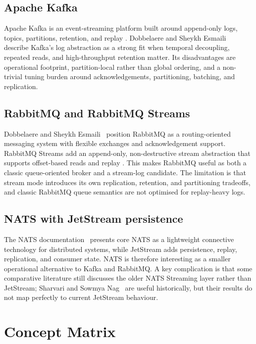\subsection{Apache Kafka}

Apache Kafka is an event-streaming platform built around append-only logs, topics, partitions, retention, and replay \cite{kafka2026official}. Dobbelaere and Sheykh Esmaili~\cite{dobbelaere2017kafkarabbitmq} describe Kafka's log abstraction as a strong fit when temporal decoupling, repeated reads, and high-throughput retention matter. Its disadvantages are operational footprint, partition-local rather than global ordering, and a non-trivial tuning burden around acknowledgements, partitioning, batching, and replication.

\subsection{RabbitMQ and RabbitMQ Streams}

Dobbelaere and Sheykh Esmaili~\cite{dobbelaere2017kafkarabbitmq} position RabbitMQ as a routing-oriented messaging system with flexible exchanges and acknowledgement support. RabbitMQ Streams add an append-only, non-destructive stream abstraction that supports offset-based reads and replay \cite{rabbitmq2026streams}. This makes RabbitMQ useful as both a classic queue-oriented broker and a stream-log candidate. The limitation is that stream mode introduces its own replication, retention, and partitioning tradeoffs, and classic RabbitMQ queue semantics are not optimised for replay-heavy logs.

\subsection{NATS with JetStream persistence}

The NATS documentation~\cite{nats2026overview,nats2026reqreply,nats2026jetstream} presents core NATS as a lightweight connective technology for distributed systems, while JetStream adds persistence, replay, replication, and consumer state. NATS is therefore interesting as a smaller operational alternative to Kafka and RabbitMQ. A key complication is that some comparative literature still discusses the older NATS Streaming layer rather than JetStream; Sharvari and Sowmya Nag~\cite{sharvari2019messaging} are useful historically, but their results do not map perfectly to current JetStream behaviour.

\section{Concept Matrix}

